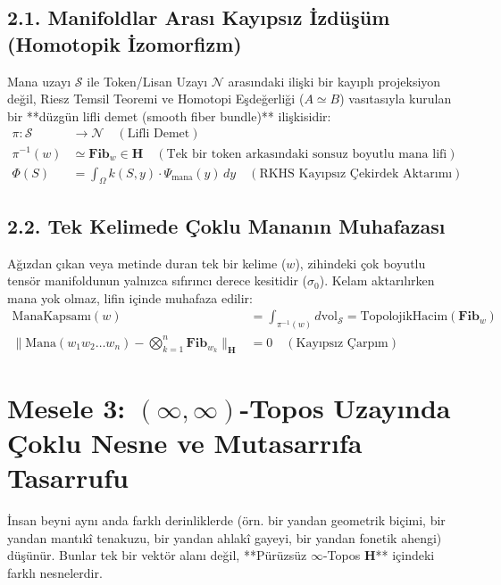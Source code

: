 \documentclass[11pt, a4paper]{article}
\begin{document}
\subsection{2.1. Manifoldlar Arası Kayıpsız İzdüşüm (Homotopik İzomorfizm)}
Mana uzayı $\mathcal{S}$ ile Token/Lisan Uzayı $\mathcal{N}$ arasındaki ilişki bir kayıplı projeksiyon değil, Riesz Temsil Teoremi ve Homotopi Eşdeğerliği ($A \simeq B$) vasıtasıyla kurulan bir **düzgün lifli demet (smooth fiber bundle)** ilişkisidir:
\begin{align}
\pi : \mathcal{S} &\longrightarrow \mathcal{N} \quad (\text{Lifli Demet}) \\
\pi^{-1}(w) &\simeq \mathbf{Fib}_w \in \mathbf{H} \quad (\text{Tek bir token arkasındaki sonsuz boyutlu mana lifi}) \\
\Phi(S) &= \int_{\Omega} k(S, y) \cdot \Psi_{\text{mana}}(y) \, dy \quad (\text{RKHS Kayıpsız Çekirdek Aktarımı})
\end{align}

\subsection{2.2. Tek Kelimede Çoklu Mananın Muhafazası}
Ağızdan çıkan veya metinde duran tek bir kelime ($w$), zihindeki çok boyutlu tensör manifoldunun yalnızca sıfırıncı derece kesitidir ($\sigma_0$). Kelam aktarılırken mana yok olmaz, lifin içinde muhafaza edilir:
\begin{align}
\text{ManaKapsamı}(w) &= \int_{\pi^{-1}(w)} d\text{vol}_{\mathcal{S}} = \text{TopolojikHacim}\left( \mathbf{Fib}_w \right) \\
\| \text{Mana}(w_1 w_2 \dots w_n) - \bigotimes_{k=1}^n \mathbf{Fib}_{w_k} \|_{\mathbf{H}} &= 0 \quad (\text{Kayıpsız Çarpım})
\end{align}

\section{Mesele 3: $(\infty, \infty)$-Topos Uzayında Çoklu Nesne ve Mutasarrıfa Tasarrufu}

İnsan beyni aynı anda farklı derinliklerde (örn. bir yandan geometrik biçimi, bir yandan mantıkî tenakuzu, bir yandan ahlakî gayeyi, bir yandan fonetik ahengi) düşünür. Bunlar tek bir vektör alanı değil, **Pürüzsüz $\infty$-Topos $\mathbf{H}$** içindeki farklı nesnelerdir.
\end{document}
